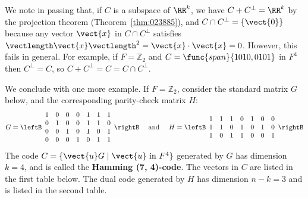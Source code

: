 \noindent We note in passing that, if $C$ is a subspace of $\RR^k$, we have $C + C^{\perp} = \RR^k$ by the projection theorem (Theorem~\ref{thm:023885}), and $C \cap C^{\perp} = \{\vect{0}\}$ because any vector $\vect{x}$ in $C \cap C^{\perp}$ satisfies $\vectlength\vect{x}\vectlength^{2} = \vect{x} \cdot \vect{x} = 0$. However, this fails in general. For example, if $F = \mathbb{Z}_2$ and $C = \func{span}\{1010, 0101\}$ in $F^{4}$ then $C^{\perp} = C$, so $C + C^{\perp} = C = C \cap C^{\perp}$.

We conclude with one more example. If $F = \mathbb{Z}_2$, consider the standard matrix $G$ below, and the corresponding parity-check matrix $H$:
\begin{equation*}
G = \leftB \begin{array}{rrrrrrr}
1 & 0 & 0 & 0 & 1 & 1 & 1\\
0 & 1 & 0 & 0 & 1 & 1 & 0 \\
0 & 0 & 1 & 0 & 1 & 0 & 1 \\
0 & 0 & 0 & 1 & 0 & 1 & 1 
\end{array}\rightB \quad \mbox{ and } \quad 
H = \leftB \begin{array}{rrrrrrr}
1 & 1 & 1 & 0 & 1 & 0 & 0\\
1 & 1 & 0 & 1 & 0 & 1 & 0 \\
1 & 0 & 1 & 1 & 0 & 0 & 1 
\end{array}\rightB
\end{equation*}
The code $C = \{\vect{u}G \mid \vect{u} \mbox{ in } F^{4}\}$ generated by $G$ has dimension $k = 4$, and is called the \textbf{Hamming (7, 4)-code}. The vectors in $C$ are listed in the first table below. The dual code generated by $H$ has dimension $n - k = 3$ and is listed in the second table.
